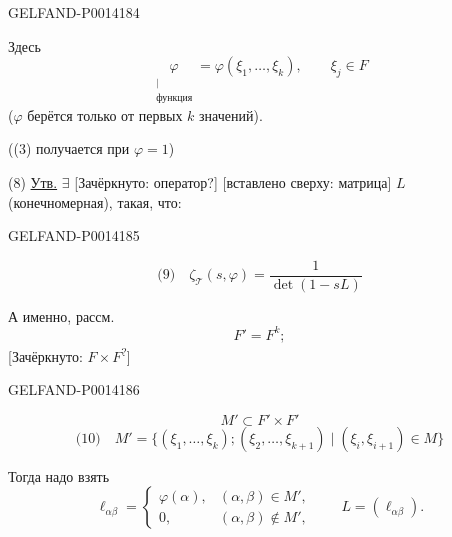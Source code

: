 \begin{GelfandAdjacentEvidence}{GELFAND-P001418}{4}


Здесь
\[
 \underset{\substack{|\\\text{функция}}}{\varphi}
 =\varphi(\xi_1,\ldots,\xi_k),\qquad \xi_j\in F
\]
(\(\varphi\) берётся только от первых \(k\) значений).

((3) получается при \(\varphi=1\))

(8) \uline{Утв.} \(\exists\) [Зачёркнуто: оператор?]
[вставлено сверху: матрица] \(L\) (конечномерная), такая, что:
\end{GelfandAdjacentEvidence}
\begin{GelfandAdjacentEvidence}{GELFAND-P001418}{5}

\[
\text{(9)}\quad \zeta_{\mathcal T}(s,\varphi)=\frac{1}{\det(1-sL)}
\]

А именно, рассм.
\[
F'=F^k;
\]
[Зачёркнуто: \(F\times F\)\textsuperscript{?}]
\end{GelfandAdjacentEvidence}
\begin{GelfandAdjacentEvidence}{GELFAND-P001418}{6}

\[
M'\subset F'\times F'
\]
\[
\text{(10)}\quad
M'=\{(\xi_1,\ldots,\xi_k);(\xi_2,\ldots,\xi_{k+1})
 \mid(\xi_i,\xi_{i+1})\in M\}
\]
\end{GelfandAdjacentEvidence}


Тогда надо взять
\[
 \ell_{\alpha\beta}=
 \begin{cases}
 \varphi(\alpha),&(\alpha,\beta)\in M',\\
 0,&(\alpha,\beta)\notin M',
 \end{cases}
 \qquad L=(\ell_{\alpha\beta}).
\]


